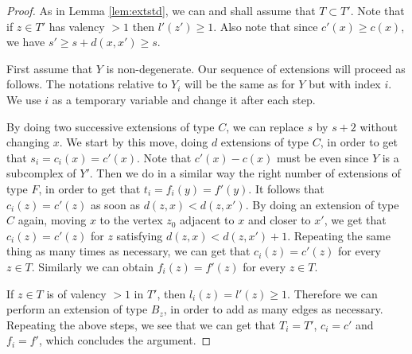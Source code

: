 \documentclass[a4paper, 11pt]{article}
\theoremstyle{plain}
\theoremstyle{definition}
\theoremstyle{remark}
\begin{document}
\begin{proof}

As in Lemma \ref{lem:extstd}, we can and shall assume that $T\subset T'$. Note that if $z\in T'$ has valency $>1$ then $l'(z')\geq 1$.
Also note that since $c'(x)\geq c(x)$, we have $s'\geq s+d(x,x')\geq s$. 




First assume that $Y$ is non-degenerate.
 Our sequence of extensions will proceed as follows. The notations relative to $Y_i$ will be the same as for $Y$ but with index $i$. We use $i$ as a temporary variable and change it after each step.

 By doing two successive extensions of type $C$, we can replace $s$ by $s+2$ without changing $x$. We start by this move, doing $d$ extensions of type $C$, in order to get that $s_i=c_i(x)=c'(x)$. Note that $c'(x)-c(x)$ must be even since $Y$ is a subcomplex of $Y'$.  
  Then we do in a similar way the right number of extensions of type $F$, in order to get that $t_{i}=f_{i}(y)=f'(y)$. It follows that $c_i(z)=c'(z)$ as soon as $d(z,x)<d(z,x')$. By doing an extension of type $C$ again, moving $x$ to the vertex $z_0$ adjacent to $x$ and closer to $x'$, we get that  $c_i(z)=c'(z)$ for $z$ satisfying $d(z,x)<d(z,x')+1$. Repeating the same thing as many times as necessary, we can get that $c_i(z)=c'(z)$ for every $z\in T$. Similarly we can obtain $f_i(z)=f'(z)$ for every $z\in T$. 
  
  If $z\in T$ is of valency $>1$ in $T'$, then $l_i(z)=l'(z)\geq 1$. Therefore we can perform an extension of type $B_z$, in order to add as many edges as necessary. Repeating the above steps, we see that we can get that $T_i=T'$, $c_i=c'$ and $f_i=f'$, which concludes the argument.


\end{proof}
\end{document}

